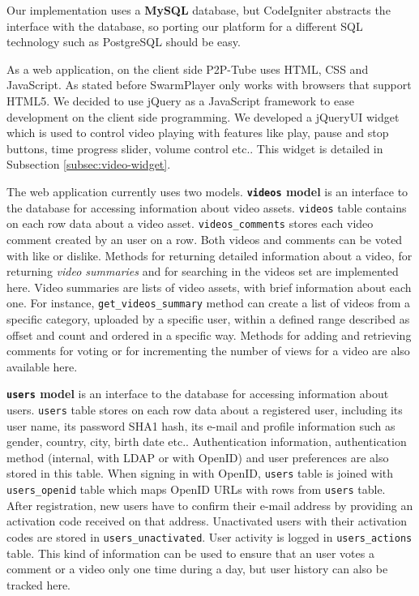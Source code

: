 Our implementation uses a \textbf{MySQL} database, but CodeIgniter abstracts the interface with the database, so porting our platform for a different SQL technology such as PostgreSQL should be easy.

As a web application, on the client side P2P-Tube uses HTML, CSS and JavaScript. As stated before SwarmPlayer only works with browsers that support HTML5. We decided to use jQuery \cite{jquery} as a JavaScript framework to ease development on the client side programming. We developed a jQueryUI \cite{jqueryui} widget which is used to control video playing with features like play, pause and stop buttons, time progress slider, volume control etc.. This widget is detailed in Subsection \ref{subsec:video-widget}.

The web application currently uses two models. \textbf{\texttt{videos} model} is an interface to the database for accessing information about video assets. \texttt{videos} table contains on each row data about a video asset. \texttt{videos_comments} stores each video comment created by an user on a row. Both videos and comments can be voted with like or dislike. Methods for returning detailed information about a video, for returning \textit{video summaries} and for searching in the videos set are implemented here. Video summaries are lists of video assets, with brief information about each one. For instance, \texttt{get_videos_summary} method can create a list of videos from a specific category, uploaded by a specific user, within a defined range described as offset and count and ordered in a specific way. Methods for adding and retrieving comments for voting or for incrementing the number of views for a video are also available here.

\textbf{\texttt{users} model} is an interface to the database for accessing information about users. \texttt{users} table stores on each row data about a registered user, including its user name, its password SHA1 hash, its e-mail and profile information such as gender, country, city, birth date etc.. Authentication information, authentication method (internal, with LDAP or with OpenID) and user preferences are also stored in this table. When signing in with OpenID, \texttt{users} table is joined with \texttt{users_openid} table which maps OpenID URLs with rows from \texttt{users} table. After registration, new users have to confirm their e-mail address by providing an activation code received on that address. Unactivated users with their activation codes are stored in \texttt{users_unactivated}. User activity is logged in \texttt{users_actions} table. This kind of information can be used to ensure that an user votes a comment or a video only one time during a day, but user history can also be tracked here.


